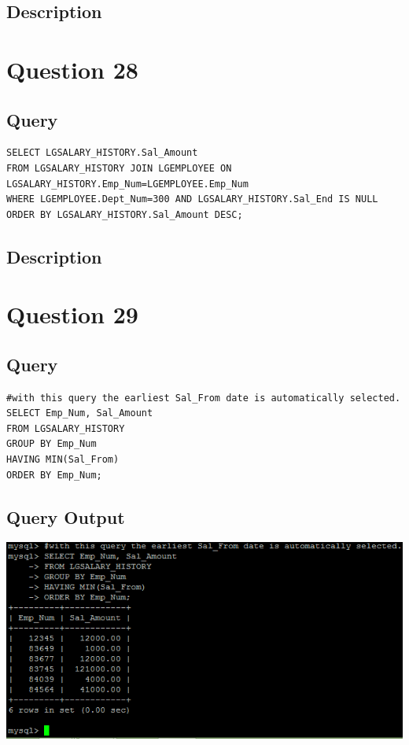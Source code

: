 \documentclass[a4paper,10pt]{article}
\begin{document}
\subsection{Description}
\section*{Question 28}
 \subsection{Query}
          \lstset{
            language=SQL,
            breaklines=true
            }
        \begin{lstlisting}[frame=single]
        SELECT LGSALARY_HISTORY.Sal_Amount
FROM LGSALARY_HISTORY JOIN LGEMPLOYEE ON LGSALARY_HISTORY.Emp_Num=LGEMPLOYEE.Emp_Num
WHERE LGEMPLOYEE.Dept_Num=300 AND LGSALARY_HISTORY.Sal_End IS NULL
ORDER BY LGSALARY_HISTORY.Sal_Amount DESC;

        \end{lstlisting}
\subsection{Description}
\section*{Question 29}
 \subsection{Query}
          \lstset{
            language=SQL,
            breaklines=true
            }
        \begin{lstlisting}[frame=single]
        #with this query the earliest Sal_From date is automatically selected.
SELECT Emp_Num, Sal_Amount
FROM LGSALARY_HISTORY
GROUP BY Emp_Num
HAVING MIN(Sal_From)
ORDER BY Emp_Num;

        \end{lstlisting}
\subsection{Query Output}
           \includegraphics{Queries/Question_29/Question_29_screenshot.PNG}
\end{document}
